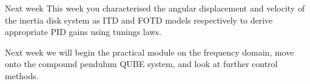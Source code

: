 \documentclass[9pt]{beamer-control}
\begin{document}
\begin{frame}{Next week}
	This week you characterised the angular displacement and velocity of the inertia disk system as ITD and FOTD models respectively to derive appropriate PID gains using tunings laws.
	
	Next week we will begin the practical module on the frequency domain, move onto the compound pendulum QUBE system, and look at further control methods.
\end{frame}
\end{document}
